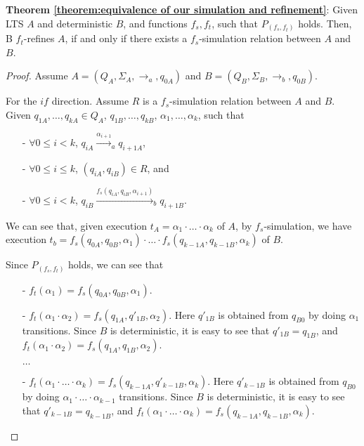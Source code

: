 {\noindent \bf Theorem \ref{theorem:equivalence of our simulation and refinement}}: Given LTS $A$ and deterministic $B$, and functions $f_s,f_t$, such that $P_{(f_s,f_t)}$ holds. Then, B $f_t$-refines $A$, if and only if there exists a $f_s$-simulation relation between $A$ and $B$.

\begin {proof}
Assume $A = (Q_A,\Sigma_A,\rightarrow_a,q_{0A})$ and $B = (Q_B,\Sigma_B,\rightarrow_b,q_{0B})$.

For the $\mathit{if}$ direction. Assume $R$ is a $f_s$-simulation relation between $A$ and $B$. Given $q_{1A},\ldots,q_{kA} \in Q_A$, $q_{1B},\ldots,q_{kB}$, $\alpha_1,\ldots,\alpha_k$, such that

\begin{itemize}
\setlength{\itemsep}{0.5pt}
\item[-] $\forall 0 \leq i < k$, $q_{iA} {\xrightarrow{\alpha_{i+1}}}_a q_{i+1A}$,

\item[-] $\forall 0 \leq i \leq k$, $(q_{iA},q_{iB}) \in R$, and

\item[-] $\forall 0 \leq i < k$, $q_{iB} {\xrightarrow{f_s(q_{iA},q_{iB},\alpha_{i+1})}}_b q_{i+1B}$.
\end{itemize}

We can see that, given execution $t_A = \alpha_1 \cdot \ldots \cdot \alpha_k$ of $A$, by $f_s$-simulation, we have execution $t_b = f_s(q_{0A},q_{0B},\alpha_1) \cdot \ldots \cdot f_s(q_{k-1A},q_{k-1B},\alpha_k)$ of $B$.

Since $P_{(f_s,f_t)}$ holds, we can see that

\begin{itemize}
\setlength{\itemsep}{0.5pt}
\item[-] $f_t(\alpha_1) = f_s(q_{0A},q_{0B},\alpha_1)$.

\item[-] $f_t(\alpha_1 \cdot \alpha_2) = f_s(q_{1A},q'_{1B},\alpha_2)$. Here $q'_{1B}$ is obtained from $q_{B0}$ by doing $\alpha_1$ transitions. Since $B$ is deterministic, it is easy to see that $q'_{1B} = q_{1B}$, and $f_t(\alpha_1 \cdot \alpha_2) = f_s(q_{1A},q_{1B},\alpha_2)$.

$\ldots$

\item[-] $f_t(\alpha_1 \cdot \ldots \cdot \alpha_k) = f_s(q_{k-1A},q'_{k-1B},\alpha_k)$. Here $q'_{k-1B}$ is obtained from $q_{B0}$ by doing $\alpha_1 \cdot \ldots \cdot \alpha_{k-1}$ transitions. Since $B$ is deterministic, it is easy to see that $q'_{k-1B} = q_{k-1B}$, and $f_t(\alpha_1 \cdot \ldots \cdot \alpha_k) = f_s(q_{k-1A},q_{k-1B},\alpha_k)$.
\end{itemize}


\end{proof}
